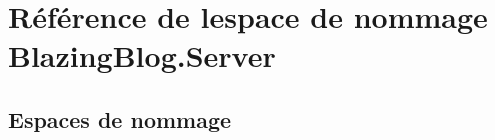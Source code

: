 \hypertarget{namespace_blazing_blog_1_1_server}{}\section{Référence de l\textquotesingle{}espace de nommage Blazing\+Blog.\+Server}
\label{namespace_blazing_blog_1_1_server}
\subsection*{Espaces de nommage}
\begin{DoxyCompactItemize}
\end{DoxyCompactItemize}

